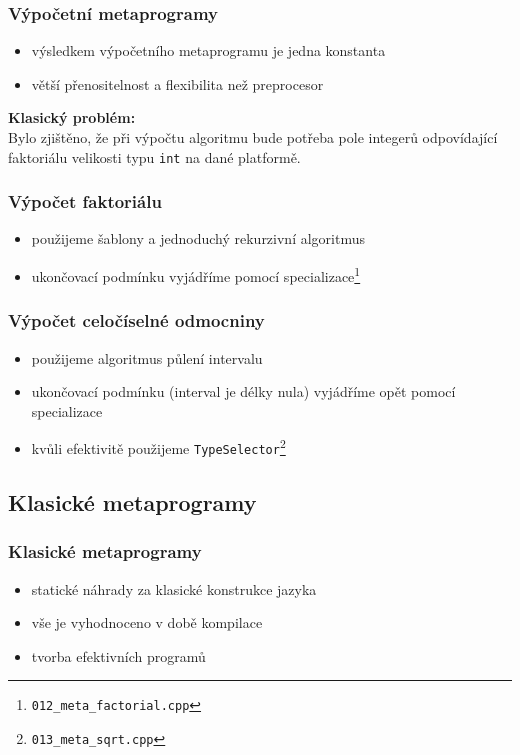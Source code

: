 	\begin{frame}
		\frametitle{Výpočetní metaprogramy}
		\begin{itemize}
			\item{výsledkem výpočetního metaprogramu je jedna konstanta}
			\item{větší přenositelnost a flexibilita než preprocesor}
		\end{itemize}\pause
		\textbf{Klasický problém:}\\
		Bylo zjištěno, že při výpočtu algoritmu bude potřeba pole integerů odpovídající faktoriálu velikosti typu \texttt{int} na dané platformě.
	\end{frame}

	\begin{frame}
		\frametitle{Výpočet faktoriálu}
		\begin{itemize}
			\item{použijeme šablony a jednoduchý rekurzivní algoritmus}
			\item{ukončovací podmínku vyjádříme pomocí specializace\footnote{\texttt{012\_meta\_factorial.cpp}}}
		\end{itemize}
	\end{frame}

	\begin{frame}
		\frametitle{Výpočet celočíselné odmocniny}
		\begin{itemize}
			\item{použijeme algoritmus půlení intervalu}
			\item{ukončovací podmínku (interval je délky nula) vyjádříme opět pomocí specializace}
			\item{kvůli efektivitě použijeme \texttt{TypeSelector}\footnote{\texttt{013\_meta\_sqrt.cpp}}}
		\end{itemize}
	\end{frame}

	\subsection{Klasické metaprogramy}

	\begin{frame}
		\frametitle{Klasické metaprogramy}
		\begin{itemize}
			\item{statické náhrady za klasické konstrukce jazyka}
			\item{vše je vyhodnoceno v době kompilace}
			\item{tvorba efektivních programů}
		\end{itemize}
	\end{frame}


